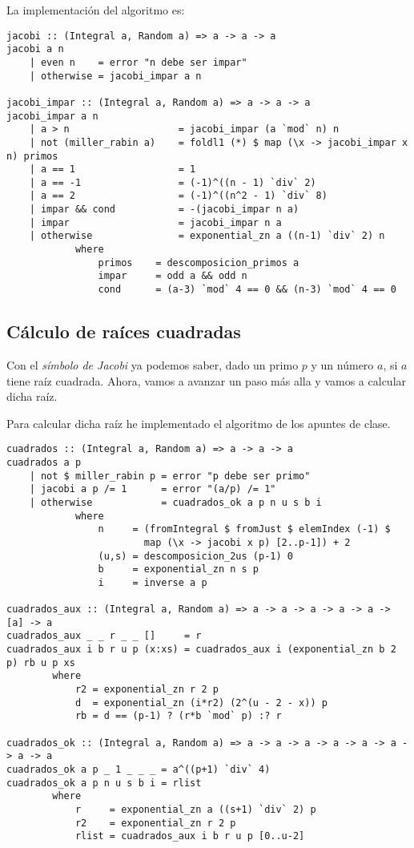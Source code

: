\documentclass[10pt,spanish]{article}
\begin{document}
La implementación del algoritmo es:

\begin{verbatim}
jacobi :: (Integral a, Random a) => a -> a -> a
jacobi a n
    | even n    = error "n debe ser impar"
    | otherwise = jacobi_impar a n

jacobi_impar :: (Integral a, Random a) => a -> a -> a
jacobi_impar a n
    | a > n                   = jacobi_impar (a `mod` n) n
    | not (miller_rabin a)    = foldl1 (*) $ map (\x -> jacobi_impar x n) primos
    | a == 1                  = 1
    | a == -1                 = (-1)^((n - 1) `div` 2)
    | a == 2                  = (-1)^((n^2 - 1) `div` 8)
    | impar && cond           = -(jacobi_impar n a)
    | impar                   = jacobi_impar n a
    | otherwise               = exponential_zn a ((n-1) `div` 2) n
            where
                primos    = descomposicion_primos a
                impar     = odd a && odd n 
                cond      = (a-3) `mod` 4 == 0 && (n-3) `mod` 4 == 0
\end{verbatim}

\subsection{\textcolor{rojo}Cálculo de raíces cuadradas}
Con el \textit{\textcolor{rojo}{símbolo de Jacobi}} ya podemos saber, dado un primo $p$ y un número $a$, si $a$ tiene raíz cuadrada. Ahora, vamos a avanzar un paso más alla y vamos a calcular dicha raíz. 

Para calcular dicha raíz he implementado el algoritmo de los apuntes de clase.

\begin{verbatim}
cuadrados :: (Integral a, Random a) => a -> a -> a
cuadrados a p
    | not $ miller_rabin p = error "p debe ser primo"
    | jacobi a p /= 1      = error "(a/p) /= 1"
    | otherwise            = cuadrados_ok a p n u s b i
            where
                n     = (fromIntegral $ fromJust $ elemIndex (-1) $ 
                        map (\x -> jacobi x p) [2..p-1]) + 2
                (u,s) = descomposicion_2us (p-1) 0
                b     = exponential_zn n s p
                i     = inverse a p

cuadrados_aux :: (Integral a, Random a) => a -> a -> a -> a -> a -> [a] -> a
cuadrados_aux _ _ r _ _ []     = r
cuadrados_aux i b r u p (x:xs) = cuadrados_aux i (exponential_zn b 2 p) rb u p xs
        where
            r2 = exponential_zn r 2 p
            d  = exponential_zn (i*r2) (2^(u - 2 - x)) p
            rb = d == (p-1) ? (r*b `mod` p) :? r

cuadrados_ok :: (Integral a, Random a) => a -> a -> a -> a -> a -> a -> a -> a
cuadrados_ok a p _ 1 _ _ _ = a^((p+1) `div` 4)
cuadrados_ok a p n u s b i = rlist
        where
            r     = exponential_zn a ((s+1) `div` 2) p
            r2    = exponential_zn r 2 p
            rlist = cuadrados_aux i b r u p [0..u-2]
\end{verbatim}
\end{document}
